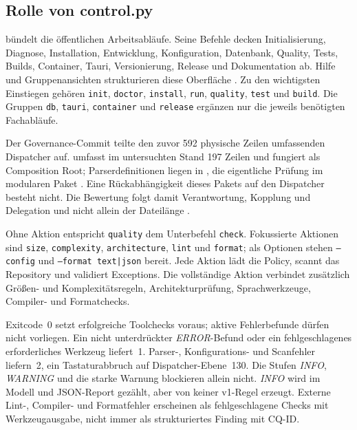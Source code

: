 \subsection{Rolle von control.py}
\label{subsec:rolle-control-py}

 bündelt die öffentlichen Arbeitsabläufe. Seine Befehle
decken Initialisierung, Diagnose, Installation, Entwicklung, Konfiguration,
Datenbank, Quality, Tests, Builds, Container, Tauri, Versionierung, Release und
Dokumentation ab. Hilfe und Gruppenansichten strukturieren diese Oberfläche
\parencite{kleiveist2026control,kleiveist2026quality-implementation}.
Zu den wichtigsten Einstiegen gehören \texttt{init}, \texttt{doctor},
\texttt{install}, \texttt{run}, \texttt{quality}, \texttt{test} und
\texttt{build}. Die Gruppen \texttt{db}, \texttt{tauri},
\texttt{container} und \texttt{release} ergänzen nur die jeweils benötigten
Fachabläufe.



Der Governance-Commit teilte den zuvor 592 physische Zeilen umfassenden
Dispatcher auf.  umfasst im untersuchten Stand 197
Zeilen und fungiert als Composition Root; Parserdefinitionen liegen in
, die eigentliche Prüfung im modularen Paket
. Eine Rückabhängigkeit dieses Pakets auf den Dispatcher
besteht nicht. Die Bewertung folgt damit Verantwortung, Kopplung und
Delegation und nicht allein der Dateilänge
\parencite{kleiveist2026governance-commit}.

Ohne Aktion entspricht \texttt{quality} dem Unterbefehl \texttt{check}.
Fokussierte Aktionen sind \texttt{size}, \texttt{complexity},
\texttt{architecture}, \texttt{lint} und \texttt{format}; als Optionen stehen
\texttt{--config} und \texttt{--format text|json} bereit. Jede Aktion lädt die
Policy, scannt das Repository und validiert Exceptions. Die vollständige
Aktion verbindet zusätzlich Größen- und Komplexitätsregeln,
Architekturprüfung, Sprachwerkzeuge, Compiler- und Formatchecks.

Exitcode~0 setzt erfolgreiche Toolchecks voraus; aktive Fehlerbefunde dürfen
nicht vorliegen. Ein nicht unterdrückter \emph{ERROR}-Befund oder ein
fehlgeschlagenes erforderliches Werkzeug liefert~1. Parser-, Konfigurations-
und Scanfehler liefern~2, ein Tastaturabbruch auf Dispatcher-Ebene~130. Die
Stufen \emph{INFO}, \emph{WARNING} und die starke Warnung blockieren allein
nicht. \emph{INFO} wird im Modell und JSON-Report gezählt, aber von keiner
v1-Regel erzeugt. Externe Lint-, Compiler- und Formatfehler erscheinen als
fehlgeschlagene Checks mit Werkzeugausgabe, nicht immer als strukturiertes
Finding mit CQ-ID.

